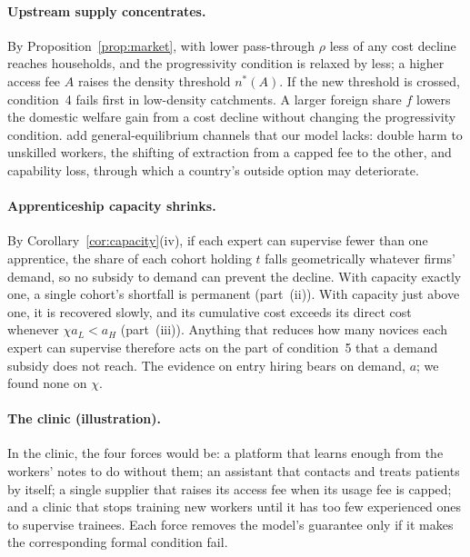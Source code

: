 \documentclass[12pt]{article}
\theoremstyle{remark}
\begin{document}
\paragraph{Upstream supply concentrates.} By Proposition~\ref{prop:market}, with lower pass-through $\rho$ less of any cost decline reaches households, and the progressivity condition is relaxed by less; a higher access fee $A$ raises the density threshold $n^*(A)$. If the new threshold is crossed, condition~4 fails first in low-density catchments. A larger foreign share $f$ lowers the domestic welfare gain from a cost decline without changing the progressivity condition. \citet[pp.~106, 110--111]{athey2026competition} add general-equilibrium channels that our model lacks: double harm to unskilled workers, the shifting of extraction from a capped fee to the other, and capability loss, through which a country's outside option may deteriorate.

\paragraph{Apprenticeship capacity shrinks.} By Corollary~\ref{cor:capacity}(iv), if each expert can supervise fewer than one apprentice, the share of each cohort holding $t$ falls geometrically whatever firms' demand, so no subsidy to demand can prevent the decline. With capacity exactly one, a single cohort's shortfall is permanent (part~(ii)). With capacity just above one, it is recovered slowly, and its cumulative cost exceeds its direct cost whenever $\chi a_L<a_H$ (part~(iii)). Anything that reduces how many novices each expert can supervise therefore acts on the part of condition~5 that a demand subsidy does not reach. The evidence on entry hiring \citep{brynjolfsson2025canaries,hosseini2025seniority} bears on demand, $a$; we found none on $\chi$.

\paragraph{The clinic (illustration).} In the clinic, the four forces would be: a platform that learns enough from the workers' notes to do without them; an assistant that contacts and treats patients by itself; a single supplier that raises its access fee when its usage fee is capped; and a clinic that stops training new workers until it has too few experienced ones to supervise trainees. Each force removes the model's guarantee only if it makes the corresponding formal condition fail.
\end{document}

